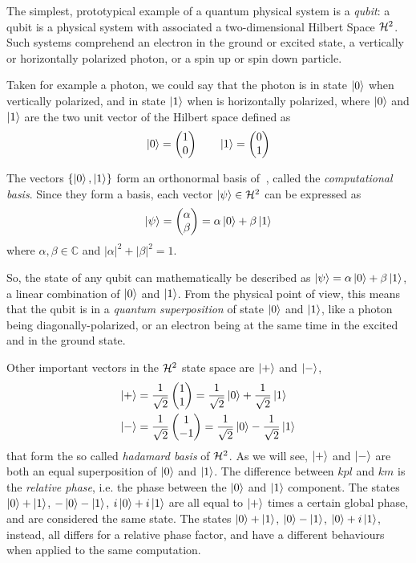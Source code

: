 The simplest, prototypical example of a quantum physical system is a \textit{qubit}: a qubit is a physical system with associated a two-dimensional Hilbert Space $\mathcal{H}^2$. Such systems comprehend an electron in the ground or excited state, a vertically or horizontally polarized photon, or a spin up or spin down particle.

Taken for example a photon, we could say that the photon is in state $\ket{0}$ when vertically polarized, and in state $\ket{1}$ when is horizontally polarized, where $\ket{0}$ and $\ket{1}$ are the two unit vector of the Hilbert space defined as
\[
	\ket{0} = \begin{pmatrix}
	1 \\
	0
	\end{pmatrix} \qquad
	\ket{1} = \begin{pmatrix}
	0 \\
	1
	\end{pmatrix}
\]

The vectors $\{\ket{0}, \ket{1}\}$ form an orthonormal basis of $\ $, called the \textit{computational basis}. Since they form a basis, each vector $\ket{\psi} \in \mathcal{H}^2$ can be expressed as 
	\[\ket{\psi} = \begin{pmatrix}
	\alpha \\
	\beta
	\end{pmatrix} = 
	\alpha\ket{0} + \beta\ket{1}
	\]
where $\alpha, \beta \in \mathbb{C}$ and $|\alpha|^2 + |\beta|^2 = 1$.

So, the state of any qubit can mathematically be described as $\ket{\psi} = \alpha\ket{0} +\beta\ket{1}$, a linear combination of $\ket{0}$ and $\ket{1}$. From the physical point of view, this means that the qubit is in a \textit{quantum superposition} of state $\ket{0}$ and $\ket{1}$, like a photon being diagonally-polarized, or an electron being at the same time in the excited and in the ground state.

Other important vectors in the $\mathcal{H}^2$ state space are $\ket{+}$ and $\ket{-}$,
\begin{align*}
	\ket{+} = \frac{1}{\sqrt{2}} &\begin{pmatrix}
	1 \\
	1
	\end{pmatrix}  = \frac{1}{\sqrt{2}}\ket{0} + \frac{1}{\sqrt{2}}\ket{1}   \\
	\ket{-}  = \frac{1}{\sqrt{2}} &\begin{pmatrix}
	1 \\
	-1
	\end{pmatrix}  = \frac{1}{\sqrt{2}}\ket{0} - \frac{1}{\sqrt{2}}\ket{1} 
\end{align*}
that form the so called \textit{hadamard basis} of $\mathcal{H}^2$. As we will see, $\ket{+}$ and $\ket{-}$ are both an equal superposition of $\ket{0}$ and $\ket{1}$. The difference between $kpl$ and $km$ is the \textit{relative phase}, i.e. the phase between the $\ket{0}$ and $\ket{1}$ component. The states $\ket{0} + \ket{1}$, $-\ket{0} -\ket{1}$, $i\ket{0} + i\ket{1}$ are all equal to $\ket{+}$ times a certain global phase, and are considered the same state. The states $\ket{0} + \ket{1}$, $\ket{0} - \ket{1}$, $\ket{0} +i\ket{1}$, instead, all differs for a relative phase factor, and have a different behaviours when applied to the same computation. 
